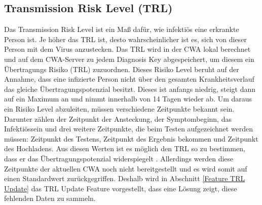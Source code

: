 \documentclass[conference,compsoc]{IEEEtran}
\begin{document}
\subsection{Transmission Risk Level (TRL)} \label{TRL}
Das Transmission Risk Level ist ein Maß dafür, wie infektiös eine erkrankte Person ist. Je höher das TRL ist, desto wahrscheinlicher ist es, sich von dieser Person mit dem Virus anzustecken.
Das TRL wird in der CWA lokal berechnet und auf dem CWA-Server zu jedem Diagnosis Key abgespeichert, um diesem ein Übertragungs Risiko (TRL) zuzuordnen. 
Dieses Risiko Level beruht auf der Annahme, dass eine infizierte Person nicht über den gesamten Krankheitsverlauf das gleiche Übertragungspotenzial besitzt. 
Dieses ist anfangs niedrig, steigt dann auf ein Maximum an und nimmt innerhalb von 14 Tagen wieder ab. Um daraus ein Risiko Level abzuleiten, müssen verschiedene Zeitpunkte bekannt sein. 
Darunter zählen der Zeitpunkt der Ansteckung, der Symptombeginn, das Infektiössein und drei weitere Zeitpunkte, die beim Testen aufgezeichnet werden müssen: 
Zeitpunkt des Testens, Zeitpunkt des Ergebnis bekommen und Zeitpunkt des Hochladens. Aus diesen Werten ist es möglich den TRL so zu bestimmen, 
dass er das Übertragungspotenzial widerspiegelt \cite{CWADokuTRL}.
Allerdings werden diese Zeitpunkte der aktuellen CWA noch nicht bereitgestellt und es wird somit auf einen Standardwert zurückgegriffen.
Deshalb wird in Abschnitt \ref{Feature TRL Update} das TRL Update  Feature vorgestellt, dass eine Lösung zeigt, diese fehlenden Daten zu sammeln.
\end{document}
